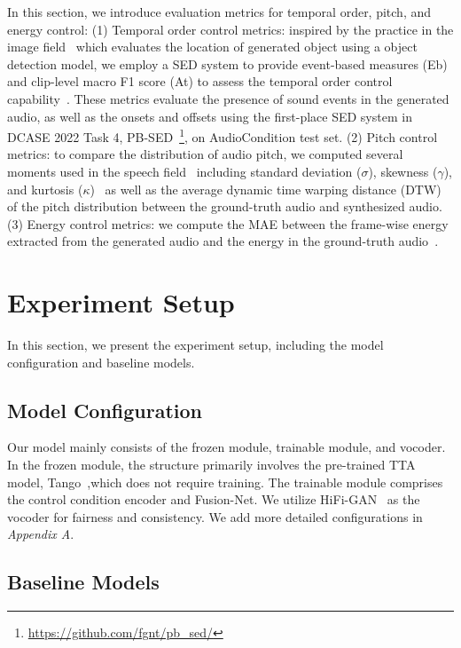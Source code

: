 \documentclass[letterpaper]{article} %
\begin{document}
In this section, we introduce evaluation metrics for temporal order, pitch, and energy control: (1) Temporal order control metrics: inspired by the practice in the image field~\cite{li2023gligen,jahn2021highresolutioncs} which evaluates the location of generated object using a object detection model, we employ a SED system to provide event-based measures (Eb) and clip-level macro F1 score (At) to assess the temporal order control capability~\cite{mesaros2016eventf1}. These metrics evaluate the presence of sound events in the generated audio, as well as the onsets and offsets using the first-place SED system in DCASE 2022 Task 4, PB-SED~\cite{janek2022pssed,janek2020fbsedt,janek2021sased}\footnote{\url{https://github.com/fgnt/pb_sed/}}, on AudioCondition test set. (2) Pitch control metrics: to compare the distribution of audio pitch, we computed several moments used in the speech field~\cite{ren2021fastspeech2} including standard deviation ($\sigma$), skewness ($\gamma$), and kurtosis ($\kappa$)~\cite{bistra2014diffpitch,niebuhr2019measuringas} as well as the average dynamic time warping distance (DTW)~\cite{muller2007dtw} of the pitch distribution between the ground-truth audio and synthesized audio. (3) Energy control metrics: we compute the MAE between the frame-wise energy extracted from the generated audio and the energy in the ground-truth audio~\cite{ren2021fastspeech2}.

\section{Experiment Setup}

In this section, we present the experiment setup, including the model configuration and baseline models.

\subsection{Model Configuration}

Our model mainly consists of the frozen module, trainable module, and vocoder. In the frozen module, the structure primarily involves the pre-trained TTA model, Tango~\cite{ghosal2023tango},which does not require training. The trainable module comprises the control condition encoder and Fusion-Net. We utilize HiFi-GAN~\cite{kong2020hifigan} as the vocoder for fairness and consistency. We add more detailed configurations in \textit{Appendix A}.

\subsection{Baseline Models}
\end{document}
